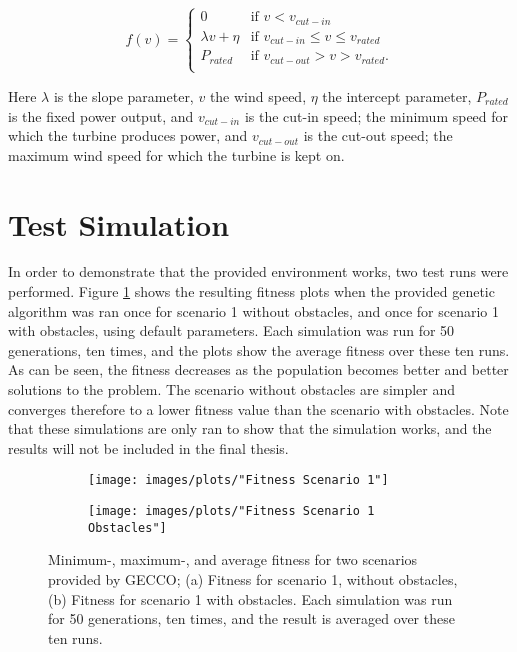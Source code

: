 \begin{equation}
 f(v) = 
  \begin{cases} 
   0                                  & \text{if }     v < v_{cut-in} \\
   \lambda v + \eta           & \text{if }     v_{cut-in} \leq v \leq v_{rated} \\
   P_{rated}                        & \text{if }     v_{cut-out} > v > v_{rated}. \\
  \end{cases}
  \label{equation:Power Curv (API)}
\end{equation}

\noindent Here $\lambda$ is the slope parameter, $v$ the wind speed, $\eta$ the intercept parameter, $P_{rated}$ is the fixed power output, and $v_{cut-in}$ is the cut-in speed; the minimum speed for which the turbine produces power, and $v_{cut-out}$ is the cut-out speed; the maximum wind speed for which the turbine is kept on. 


\section{Test Simulation}\label{section:testsimulation}
In order to demonstrate that the provided environment works, two test runs were performed. Figure \ref{Test Plots} shows the resulting fitness plots when the provided genetic algorithm was ran once for scenario 1 without obstacles, and once for scenario 1 with obstacles, using default parameters. Each simulation was run for 50 generations, ten times, and the plots show the average fitness over these ten runs. As can be seen, the fitness decreases as the population becomes better and better solutions to the problem. The scenario without obstacles are simpler and converges therefore to a lower fitness value than the scenario with obstacles. Note that these simulations are only ran to show that the simulation works, and the results will not be included in the final thesis. 


\begin{figure}[h!]
    \centering
    \begin{subfigure}[b]{0.45\textwidth}
        \texttt{[image: images/plots/"Fitness Scenario 1"]}
        \caption{}
    \end{subfigure}
    \begin{subfigure}[b]{0.45\textwidth}
        \texttt{[image: images/plots/"Fitness Scenario 1 Obstacles"]}
        \caption{}
    \end{subfigure}
    \caption{Minimum-, maximum-, and average fitness for two scenarios provided by GECCO; (a) Fitness for scenario 1, without obstacles, (b) Fitness for scenario 1 with obstacles. Each simulation was run for 50 generations, ten times, and the result is averaged over these ten runs.}
    \label{Test Plots}
\end{figure}


